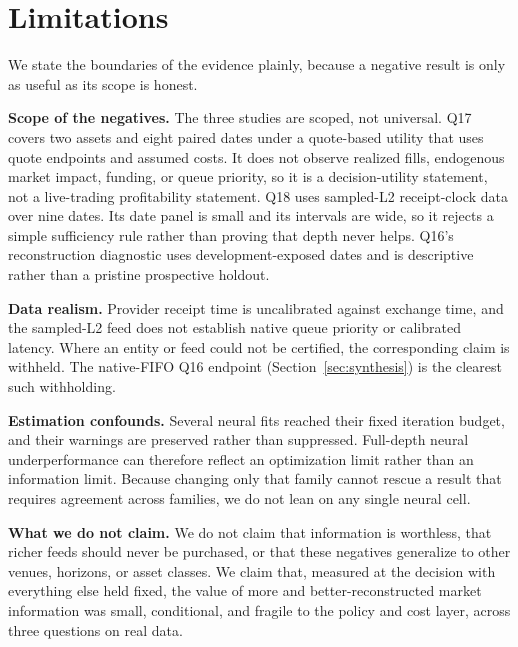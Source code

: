 \section{Limitations}
\label{sec:limitations}

We state the boundaries of the evidence plainly, because a negative result is only as
useful as its scope is honest.

\textbf{Scope of the negatives.} The three studies are scoped, not universal. Q17 covers
two assets and eight paired dates under a quote-based utility that uses quote endpoints and
assumed costs. It does not observe realized fills, endogenous market impact, funding, or
queue priority, so it is a decision-utility statement, not a live-trading profitability
statement. Q18 uses sampled-L2 receipt-clock data over nine dates. Its date panel is small
and its intervals are wide, so it rejects a simple sufficiency rule rather than proving
that depth never helps. Q16's reconstruction diagnostic uses development-exposed dates and
is descriptive rather than a pristine prospective holdout.

\textbf{Data realism.} Provider receipt time is uncalibrated against exchange time, and the
sampled-L2 feed does not establish native queue priority or calibrated latency. Where an
entity or feed could not be certified, the corresponding claim is withheld. The
native-FIFO Q16 endpoint (Section~\ref{sec:synthesis}) is the clearest such withholding.

\textbf{Estimation confounds.} Several neural fits reached their fixed iteration budget,
and their warnings are preserved rather than suppressed. Full-depth neural underperformance
can therefore reflect an optimization limit rather than an information limit. Because
changing only that family cannot rescue a result that requires agreement across families,
we do not lean on any single neural cell.

\textbf{What we do not claim.} We do not claim that information is worthless, that richer
feeds should never be purchased, or that these negatives generalize to other venues,
horizons, or asset classes. We claim that, measured at the decision with everything else
held fixed, the value of more and better-reconstructed market information was small,
conditional, and fragile to the policy and cost layer, across three questions on real
data.
